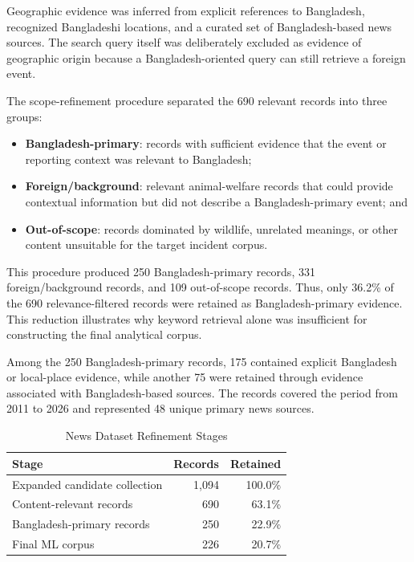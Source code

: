 \documentclass[conference]{IEEEtran}
\begin{document}
Geographic evidence was inferred from explicit references to Bangladesh,
recognized Bangladeshi locations, and a curated set of Bangladesh-based news
sources. The search query itself was deliberately excluded as evidence of
geographic origin because a Bangladesh-oriented query can still retrieve a
foreign event.

The scope-refinement procedure separated the 690 relevant records into three
groups:

\begin{itemize}
    \item \textbf{Bangladesh-primary}: records with sufficient evidence that
    the event or reporting context was relevant to Bangladesh;
    
    \item \textbf{Foreign/background}: relevant animal-welfare records that
    could provide contextual information but did not describe a
    Bangladesh-primary event; and
    
    \item \textbf{Out-of-scope}: records dominated by wildlife, unrelated
    meanings, or other content unsuitable for the target incident corpus.
\end{itemize}

This procedure produced 250 Bangladesh-primary records, 331
foreign/background records, and 109 out-of-scope records. Thus, only 36.2\%
of the 690 relevance-filtered records were retained as Bangladesh-primary
evidence. This reduction illustrates why keyword retrieval alone was
insufficient for constructing the final analytical corpus.

Among the 250 Bangladesh-primary records, 175 contained explicit
Bangladesh or local-place evidence, while another 75 were retained through
evidence associated with Bangladesh-based sources. The records covered the
period from 2011 to 2026 and represented 48 unique primary news sources.

\begin{table}[!t]
\centering
\caption{News Dataset Refinement Stages}
\label{tab:data_refinement}
\renewcommand{\arraystretch}{1.15}
\begin{tabular}{lrr}
\toprule
\textbf{Stage} & \textbf{Records} & \textbf{Retained} \\
\midrule
Expanded candidate collection & 1,094 & 100.0\% \\
Content-relevant records       & 690   & 63.1\% \\
Bangladesh-primary records     & 250   & 22.9\% \\
Final ML corpus                & 226   & 20.7\% \\
\bottomrule
\end{tabular}
\end{table}
\end{document}
